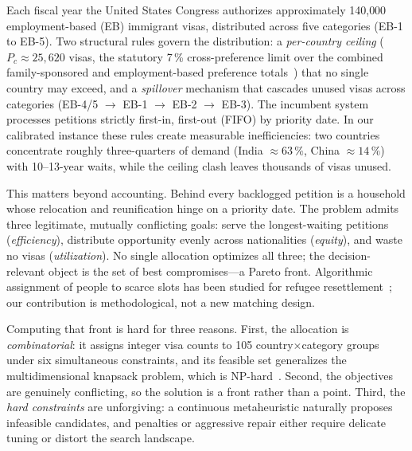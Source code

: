 \documentclass[runningheads]{llncs}
\begin{document}
Each fiscal year the United States Congress authorizes approximately 140{,}000 employment-based (EB) immigrant visas, distributed across five categories (EB-1 to EB-5). Two structural rules govern the distribution: a \emph{per-country ceiling} ($P_c \approx 25{,}620$ visas, the statutory 7\,\% cross-preference limit over the combined family-sponsored and employment-based preference totals~\cite{uscis}) that no single country may exceed, and a \emph{spillover} mechanism that cascades unused visas across categories (EB-4/5 $\rightarrow$ EB-1 $\rightarrow$ EB-2 $\rightarrow$ EB-3). The incumbent system processes petitions strictly first-in, first-out (FIFO) by priority date. In our calibrated instance these rules create measurable inefficiencies: two countries concentrate roughly three-quarters of demand (India $\approx 63\,\%$, China $\approx 14\,\%$) with 10--13-year waits, while the ceiling clash leaves thousands of visas unused.

This matters beyond accounting. Behind every backlogged petition is a household whose relocation and reunification hinge on a priority date. The problem admits three legitimate, mutually conflicting goals: serve the longest-waiting petitions (\emph{efficiency}), distribute opportunity evenly across nationalities (\emph{equity}), and waste no visas (\emph{utilization}). No single allocation optimizes all three; the decision-relevant object is the set of best compromises---a Pareto front. Algorithmic assignment of people to scarce slots has been studied for refugee resettlement~\cite{bansak}; our contribution is methodological, not a new matching design.

Computing that front is hard for three reasons. First, the allocation is \emph{combinatorial}: it assigns integer visa counts to 105 country$\times$category groups under six simultaneous constraints, and its feasible set generalizes the multidimensional knapsack problem, which is NP-hard~\cite{garey}. Second, the objectives are genuinely conflicting, so the solution is a front rather than a point. Third, the \emph{hard constraints} are unforgiving: a continuous metaheuristic naturally proposes infeasible candidates, and penalties or aggressive repair either require delicate tuning or distort the search landscape.
\end{document}
